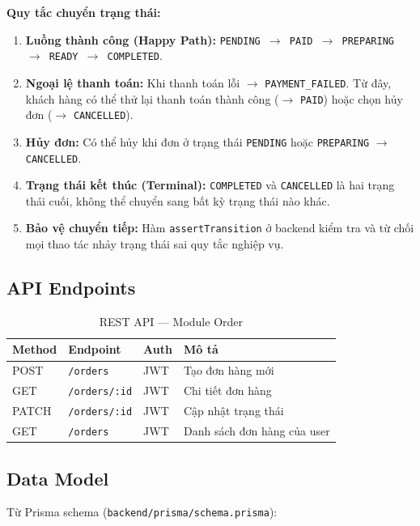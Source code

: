 \documentclass[12pt,a4paper]{article}
\begin{document}
\textbf{Quy tắc chuyển trạng thái:}
\begin{enumerate}
  \item \textbf{Luồng thành công (Happy Path):} \texttt{PENDING $\to$ PAID $\to$ PREPARING $\to$ READY $\to$ COMPLETED}.
  \item \textbf{Ngoại lệ thanh toán:} Khi thanh toán lỗi $\to$ \texttt{PAYMENT\_FAILED}. Từ đây, khách hàng có thể thử lại thanh toán thành công ($\to$ \texttt{PAID}) hoặc chọn hủy đơn ($\to$ \texttt{CANCELLED}).
  \item \textbf{Hủy đơn:} Có thể hủy khi đơn ở trạng thái \texttt{PENDING} hoặc \texttt{PREPARING} $\to$ \texttt{CANCELLED}.
  \item \textbf{Trạng thái kết thúc (Terminal):} \texttt{COMPLETED} và \texttt{CANCELLED} là hai trạng thái cuối, không thể chuyển sang bất kỳ trạng thái nào khác.
  \item \textbf{Bảo vệ chuyển tiếp:} Hàm \texttt{assertTransition} ở backend kiểm tra và từ chối mọi thao tác nhảy trạng thái sai quy tắc nghiệp vụ.
\end{enumerate}

\subsection{API Endpoints}


\begin{table}[H]
\centering
\caption{REST API — Module Order}
\begin{tabular}{llll}
\toprule
\textbf{Method} & \textbf{Endpoint} & \textbf{Auth} & \textbf{Mô tả} \\
\midrule
POST  & \texttt{/orders}     & JWT & Tạo đơn hàng mới \\
GET   & \texttt{/orders/:id} & JWT & Chi tiết đơn hàng \\
PATCH & \texttt{/orders/:id} & JWT & Cập nhật trạng thái \\
GET   & \texttt{/orders}     & JWT & Danh sách đơn hàng của user \\
\bottomrule
\end{tabular}
\end{table}

\subsection{Data Model}

Từ Prisma schema (\texttt{backend/prisma/schema.prisma}):
\end{document}
